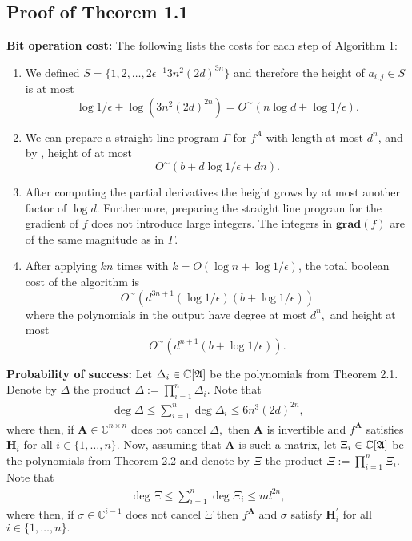 \documentclass[sigconf]{acmart}
\def\mA{{\bm A}}
\def\C{\mathbb{C}}
\def\grad{\textbf{grad}}
\def\D{\Delta}
\def\A{\frak{A}}
\begin{document}
\subsection{Proof of Theorem 1.1}
%
\textbf{Bit operation cost:} The following lists the costs for each step of Algorithm 1:
%
\begin{enumerate}
    \item We defined $S = \{1,2,\hdots,2\epsilon^{-1}3n^2(2d)^{3n}\}$ and therefore the height of $a_{i,j} \in S$ is at most 
    \[
    \log 1/{\epsilon} + \log(3n^2(2d)^{2n}) = O^{\sim}(n\log d + \log 1/{\epsilon}).
    \]
    \item  We can prepare a straight-line program $\Gamma$ for $f^A$ with length at most $d^n$, and 
    by \cite[Lemma 1.2(1)(c)]{SharpEstimatesForTheEffectiveN}, height of at most 
    \[
        O^{\sim}(b + d\log 1 / \epsilon + dn).
    \]
    \item 
    After computing the partial derivatives the height grows by at most another factor of $\log d$. Furthermore, preparing the straight line program for the gradient of $f$ does not introduce large integers. The integers in $\grad (f)$ are of the same magnitude as in $\Gamma$.
    \item 
    After applying \cite[Algorithm 2]{SH} $kn$ times with $k = O(\log n + \log 1 / \epsilon)$, the total boolean cost of the algorithm is
  \[
O^{\sim}(d^{3n+1}(\log1/\epsilon)(b + \log1/\epsilon))
  \]
    where the polynomials in the output have degree at most $d^n,$ and height at most
  \[
  O^{\sim}(d^{n+1}(b + \log 1 / \epsilon)).
  \]
\end{enumerate}
%
\par \noindent 
\textbf{Probability of success:} Let $\Delta_i \in \C[\A]$ be the polynomials from Theorem 2.1. Denote by $\Delta$ the product $\Delta := \prod_{i=1}^n \D_i.$ Note that 
\begin{align}
    \deg \Delta \leq \sum_{i=1}^n \deg \Delta_i \leq 6n^3(2d)^{2n},
\end{align}
where then, if $\mA \in \C^{n \times n}$ does not cancel $\Delta,$ then  $\mA$ is invertible and $f^\mA$ satisfies $\textbf{H}_i$ for all $i \in \{1,\hdots,n\}.$ Now, assuming that $\mA$ is such a matrix, let $\Xi_i\in \C[\A]$ be the polynomials from Theorem 2.2 and denote by $\Xi$ the product $\Xi := \prod_{i=1}^n \Xi_i.$ Note that 
\begin{align}
    \deg \Xi \leq \sum_{i=1}^n \deg \Xi_i \leq nd^{2n},
\end{align}
where then, if $\sigma \in \C^{i-1}$ does not cancel $\Xi$ then $f^{\mA}$ and $\sigma$ satisfy $\textbf{H}_i^{'}$ for all $i \in \{1,\hdots,n\}.$ 
\end{document}
